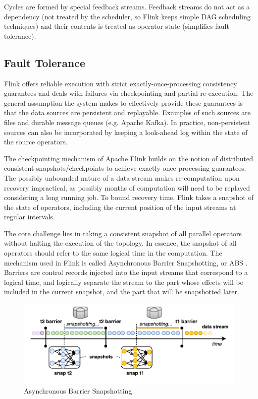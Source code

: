 Cycles are formed by special feedback streams. Feedback streams do not act as a dependency (not treated by the scheduler, so Flink keeps simple DAG scheduling techniques) and their contents is treated as operator state (simplifies fault tolerance). 

\subsection{Fault Tolerance}

\label{sec:fault-tolerance}
Flink offers reliable execution with strict exactly-once-processing consistency guarantees and deals with failures via checkpointing and partial re-execution. The general assumption the system makes to effectively provide these guarantees is that the data sources are persistent and replayable. Examples of such sources are files and durable message queues (e.g. Apache Kafka). In practice, non-persistent sources can also be incorporated by keeping a look-ahead log within the state of the source operators.

The checkpointing mechanism of Apache Flink builds on the notion of distributed consistent snapshots/checkpoints to achieve exactly-once-processing guarantees. The possibly unbounded nature of a data stream makes re-computation upon recovery impractical, as possibly months of computation will need to be replayed considering a long running job. To bound recovery time, Flink takes a snapshot of the state of operators, including the current position of the input streams at regular intervals.

The core challenge lies in taking a consistent snapshot of all parallel operators without halting the execution of the topology. In essence, the snapshot of all operators should refer to the same logical time in the computation. The mechanism used in Flink is called Asynchronous Barrier Snapshotting, or ABS \cite{carbone2015lightweight}. Barriers are control records injected into the input streams that correspond to a logical time, and logically separate the stream to the part whose effects will be included in the current snapshot, and the part that will be snapshotted later.

\begin{figure}[t!]
	\centering
  	\includegraphics[width=.75\textwidth]{figs/snaps.pdf}
  	\vspace{-6mm}
	\caption{Asynchronous Barrier Snapshotting.}
	\vspace{-2mm}
	\label{fig:snapshots}
\end{figure}

